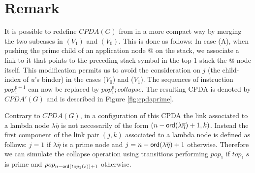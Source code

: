 \documentclass{article}
\theoremstyle{remark}
\theoremstyle{definition}
\begin{document}
\section{Remark}
It is possible to redefine $CPDA(G)$ from
\cite{hague-sto07} in a more compact way by merging the two subcases in
$(V_1)$ and $(V_0)$. This is done as follows: In case (A), when
pushing the prime child of an application node $@$ on the stack, we
associate a link to it that points to the preceding stack symbol in
the top $1$-stack \ie the $@$-node itself.
 This modification permits us to avoid the consideration on $j$ (the child-index of $u$'s binder) in the
 cases ($V_0$) and ($V_1$). The sequences of instruction $pop_1^{p+1}$ can now be replaced by
 $pop_1^p ; collapse$. The resulting CPDA is denoted by $CPDA'(G)$ and is described in
Figure \ref{fig:cpdaprime}.
\begin{figure}[htbp]
\begin{center}
\end{center}
\end{figure}
Contrary to $CPDA(G)$, in a configuration of this CPDA the link associated to a lambda node $\lambda\overline\eta$ is not necessarily of the form
$(n-{\sf ord}(\lambda\overline\eta)+1,k)$. Instead the first component of the link pair $(j,k)$ associated to a lambda node is defined as follows:
$j = 1$ if $\lambda\overline\eta$ is a prime node and $j=n-{\sf ord}(\lambda\overline\eta)+1$ otherwise. Therefore we can simulate the collapse operation
using transitions performing $pop_1$ if $top_1~s$ is prime and $pop_{n-{\sf ord}(top_1(s))+1}$ otherwise.
\clearpage



\end{document}
